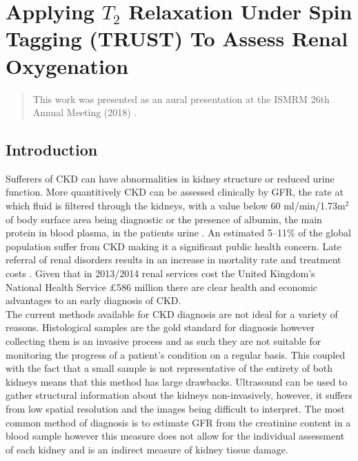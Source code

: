 \chapter{Applying $T_2$ Relaxation Under Spin Tagging (TRUST) To Assess Renal Oxygenation}
\label{chap:TRUST}

\begin{abstract}
	This work was presented as an aural presentation at the \ac{ISMRM} 26th Annual Meeting (2018) \cite{daniel_applying_2018}.\\
	\lipsum[1]
\end{abstract}
\newpage

\section{Introduction}
Sufferers of \ac{CKD} can have abnormalities in kidney structure or reduced urine function. More quantitively \ac{CKD} can be assessed clinically by \ac{GFR}, the rate at which fluid is filtered through the kidneys, with a value below 60 ml/min/1.73m$^2$ of body surface area being diagnostic or the presence of albumin, the main protein in blood plasma, in the patients urine \cite{stevens_assessing_2006, farrugia_albumin_2010, pruijm_blood_2017}. An estimated 5–11\% of the global population suffer from \ac{CKD} \cite{
	coresh_prevalence_2003, de_lusignan_identifying_2005, drey_population-based_2003, amato_prevalence_2005, chadban_prevalence_2003} making it a significant public health concern. Late referral of renal disorders results in an increase in mortality rate and treatment costs \cite{jungers_late_1993, sesso_late_1996, klebe_cost_2007}. Given that in 2013/2014 renal services cost the United Kingdom's National Health Service \pounds 586 million \cite{precious_nhs_2015} there are clear health and economic advantages to an early diagnosis of \ac{CKD}.\\

The current methods available for \ac{CKD} diagnosis are not ideal for a variety of reasons. Histological samples are the gold standard for diagnosis however collecting them is an invasive process and as such they are not suitable for monitoring the progress of a patient's condition on a regular basis. This coupled with the fact that a small sample is not representative of the entirety of both kidneys means that this method  has large drawbacks. Ultrasound can be used to gather structural information about the kidneys non-invasively, however, it suffers from low spatial resolution and the images being difficult to interpret. The most common method of diagnosis is to estimate \ac{GFR} from the creatinine content in a blood sample however this measure does not allow for the individual assessment of each kidney and is an indirect measure of kidney tissue damage.\\

